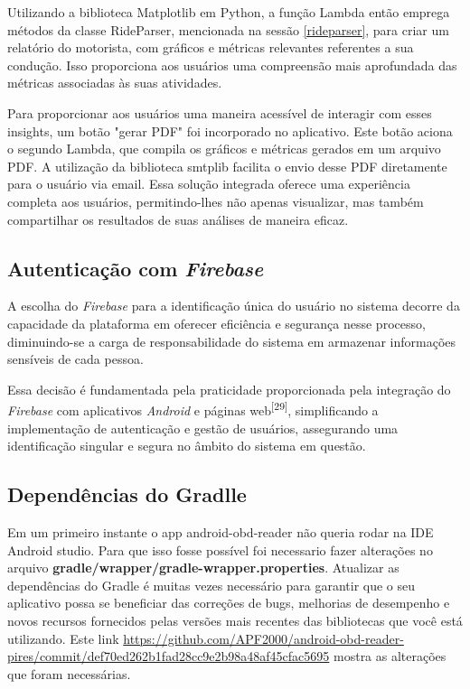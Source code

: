    Utilizando a biblioteca Matplotlib em Python, a função Lambda então emprega métodos da classe RideParser, mencionada na sessão \ref{rideparser}, para criar um relatório do motorista, com gráficos e métricas relevantes referentes a sua condução. Isso proporciona aos usuários uma compreensão mais aprofundada das métricas associadas às suas atividades.
    
    Para proporcionar aos usuários uma maneira acessível de interagir com esses insights, um botão "gerar PDF" foi incorporado no aplicativo. Este botão aciona o segundo Lambda, que compila os gráficos e métricas gerados em um arquivo PDF. A utilização da biblioteca smtplib facilita o envio desse PDF diretamente para o usuário via email. Essa solução integrada oferece uma experiência completa aos usuários, permitindo-lhes não apenas visualizar, mas também compartilhar os resultados de suas análises de maneira eficaz.    

    \subsection{Autenticação com \textit{Firebase}}

    A  escolha do \textit{Firebase} para a identificação única do usuário no sistema decorre da capacidade da plataforma em oferecer eficiência e segurança nesse processo, diminuindo-se a carga de responsabilidade do sistema em armazenar informações sensíveis de cada pessoa. 
    
    Essa decisão é fundamentada pela praticidade proporcionada pela integração do \textit{Firebase} com aplicativos \textit{Android} e páginas web\textsuperscript{[29]}, simplificando a implementação de autenticação e gestão de usuários, assegurando uma identificação singular e segura no âmbito do sistema em questão.

    \subsection{Dependências do Gradlle}

    Em um primeiro instante o app android-obd-reader não queria rodar na IDE Android studio. Para que isso fosse possível foi necessario fazer alterações no arquivo \textbf{gradle/wrapper/gradle-wrapper.properties}. Atualizar as dependências do Gradle  é muitas vezes necessário para garantir que o seu aplicativo possa se beneficiar das correções de bugs, melhorias de desempenho e novos recursos fornecidos pelas versões mais recentes das bibliotecas que você está utilizando. Este link \url{https://github.com/APF2000/android-obd-reader-pires/commit/def70ed262b1fad28cc9e2b98a48af45cfac5695} mostra as alterações que foram necessárias.

